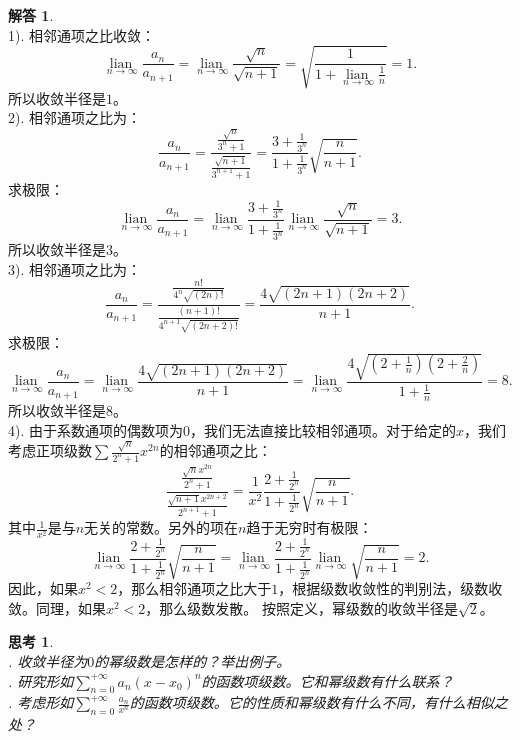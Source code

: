 \documentclass[12pt,UTF8]{ctexbook}
\newcommand{\lian}[1]{
    \underset{#1}{\operatorname{lian}\,}
}
\theoremstyle{definition}
\newtheorem*{so}{解答}
\theoremstyle{plain}
\newtheorem{sk}{思考}[section]
\begin{document}
\begin{so}
    \mbox{} \\
    1). 相邻通项之比收敛：
    $$ \lian{n\to\infty} \frac{a_n}{a_{n+1}} = \lian{n\to\infty} \frac{\sqrt{n}}{\sqrt{n+1}} = \sqrt{\frac{1}{1 + \lian{n\to\infty} \frac{1}{n}}} = 1. $$
    所以收敛半径是$1$。\\
    2). 相邻通项之比为：
    $$ \frac{a_n}{a_{n+1}} = \frac{\frac{\sqrt{n}}{3^n + 1}}{\frac{\sqrt{n+1}}{3^{n+1} + 1}} = \frac{3 + \frac{1}{3^n}}{1 + \frac{1}{3^n}}\sqrt{\frac{n}{n+1}}. $$
    求极限：
    $$ \lian{n\to\infty} \frac{a_n}{a_{n+1}} = \lian{n\to\infty} \frac{3 + \frac{1}{3^n}}{1 + \frac{1}{3^n}}\lian{n\to\infty} \frac{\sqrt{n}}{\sqrt{n+1}} = 3. $$
    所以收敛半径是$3$。\\
    3). 相邻通项之比为：
    $$ \frac{a_n}{a_{n+1}} = \frac{\frac{n!}{4^n\sqrt{(2n)!}}}{\frac{(n+1)!}{4^{n+1}\sqrt{(2n+2)!}}} = \frac{4\sqrt{(2n+1)(2n+2)}}{n+1}. $$
    求极限：
    $$ \lian{n\to\infty} \frac{a_n}{a_{n+1}} = \lian{n\to\infty}\frac{4\sqrt{(2n+1)(2n+2)}}{n+1} = \lian{n\to\infty}\frac{4\sqrt{(2+\frac{1}{n})(2+\frac{2}{n})}}{1+\frac{1}{n}} = 8. $$
    所以收敛半径是$8$。\\
    4). 由于系数通项的偶数项为$0$，我们无法直接比较相邻通项。对于给定的$x$，我们考虑正项级数$\sum \frac{\sqrt{n}}{2^n+1} x^{2n}$的相邻通项之比：
    $$ \frac{\frac{\sqrt{n}x^{2n}}{2^n+1}}{\frac{\sqrt{n+1}x^{2n+2}}{2^{n+1}+1}} = \frac{1}{x^2}\frac{2 + \frac{1}{2^n}}{1 + \frac{1}{2^n}}\sqrt{\frac{n}{n+1}}. $$
    其中$\frac{1}{x^2}$是与$n$无关的常数。另外的项在$n$趋于无穷时有极限：
    $$ \lian{n\to\infty}\frac{2 + \frac{1}{2^n}}{1 + \frac{1}{2^n}}\sqrt{\frac{n}{n+1}} = \lian{n\to\infty}\frac{2 + \frac{1}{2^n}}{1 + \frac{1}{2^n}}\lian{n\to\infty}\sqrt{\frac{n}{n+1}} = 2. $$
    因此，如果$x^2<2$，那么相邻通项之比大于$1$，根据级数收敛性的判别法，级数收敛。同理，如果$x^2<2$，那么级数发散。
    按照定义，幂级数的收敛半径是$\sqrt{2}$。

\end{so}

\begin{sk}
    \mbox{} \\
    . 收敛半径为$0$的幂级数是怎样的？举出例子。 \\
    . 研究形如$\sum_{n=0}^{+\infty} a_n (x - x_0)^n$的函数项级数。它和幂级数有什么联系？\\
    . 考虑形如$\sum_{n=0}^{+\infty} \frac{a_n}{x^n}$的函数项级数。它的性质和幂级数有什么不同，有什么相似之处？
\end{sk}
\end{document}
